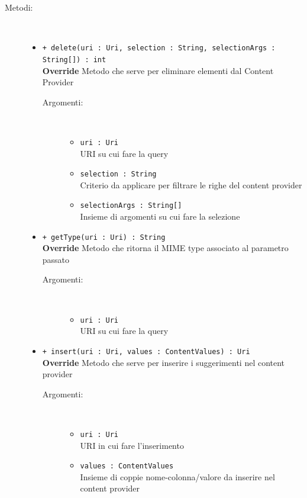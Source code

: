 \documentclass[../DefinizioneDiProdotto.tex]{subfiles}
\begin{document}
\begin{description}
\begin{itemize}
	\end{itemize}
	\item[Metodi:] \
	\begin{itemize}
		\item \texttt{+ delete(uri : Uri, selection : String, selectionArgs : String[]) : int}\\
		\textbf{Override} Metodo che serve per eliminare elementi dal Content Provider
		\begin{description}
			\item[Argomenti:] \
			\begin{itemize}
				\item \texttt{uri : Uri}\\
				URI su cui fare la query\item \texttt{selection : String}\\
				Criterio da applicare per filtrare le righe del content provider\item \texttt{selectionArgs : String[]}\\
				Insieme di argomenti su cui fare la selezione\end{itemize}
		\end{description}
		\item \texttt{+ getType(uri : Uri) : String}\\
		\textbf{Override} Metodo che ritorna il MIME type associato al parametro passato
		\begin{description}
			\item[Argomenti:] \
			\begin{itemize}
				\item \texttt{uri : Uri}\\
				URI su cui fare la query\end{itemize}
		\end{description}
		\item \texttt{+ insert(uri : Uri, values : ContentValues) : Uri}\\
		\textbf{Override} Metodo che serve per inserire i suggerimenti nel content provider
		\begin{description}
			\item[Argomenti:] \
			\begin{itemize}
				\item \texttt{uri : Uri}\\
				URI in cui fare l'inserimento\item \texttt{values : ContentValues}\\
				Insieme di coppie nome-colonna/valore da inserire nel content provider \end{itemize}

\end{description}
\end{itemize}
\end{description}
\end{document}
